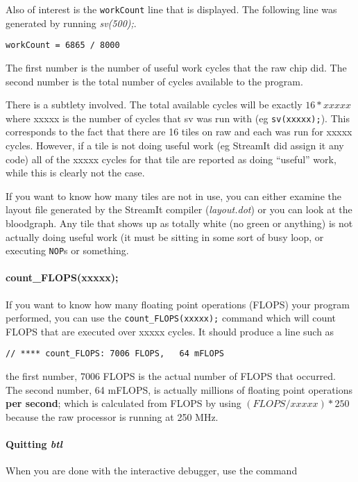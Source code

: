 Also of interest is the \texttt{workCount} line that is displayed. The
following line was generated by running \textit{sv(500);}.

\begin{verbatim}workCount = 6865 / 8000\end{verbatim}

The first number is the number of useful work cycles that the raw chip did. The second
number is the total number of cycles available to the program.

There is a subtlety involved. The total available cycles will be exactly $16*xxxxx$ where 
xxxxx is the number of cycles that sv was run with (eg \texttt{sv(xxxxx);}). This
corresponds to the fact that there are 16 tiles on raw and each was run for xxxxx cycles.
However, if a tile is not doing useful work (eg StreamIt did assign it any code)
all of the xxxxx cycles for that tile are reported as doing ``useful'' work, while this is
clearly not the case. 

If you want to know how many tiles are not in use, you can either examine the 
layout file generated by the StreamIt compiler (\textit{layout.dot}) or you
can look at the bloodgraph. Any tile that shows up as totally white (no green or anything) is
not actually doing useful work (it must be sitting in some sort of busy loop,
or executing \texttt{NOP}s or something.

\paragraph{count\_FLOPS(xxxxx);}
If you want to know how many floating point operations (FLOPS) your 
program performed, you can use the \texttt{count\_FLOPS(xxxxx);} command which will 
count FLOPS that are executed over xxxxx cycles. It should produce a line such as

\begin{verbatim}// **** count_FLOPS: 7006 FLOPS,   64 mFLOPS\end{verbatim}

the first number, 7006 FLOPS is the actual number of FLOPS that occurred. The second
number, 64 mFLOPS, is actually millions of floating point operations \textbf{per second};
which is calculated from FLOPS by using $(FLOPS/xxxxx) * 250$ because
the raw processor is running at 250 MHz.


\paragraph{Quitting \textit{btl}}
When you are done with the interactive debugger, use the command

